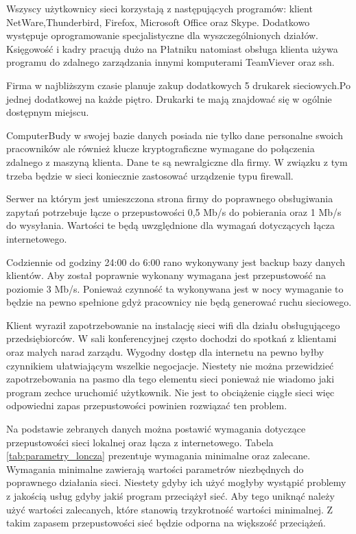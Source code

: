 \documentclass{report}
\begin{document}
Wszyscy użytkownicy sieci korzystają z następujących programów: klient NetWare,Thunderbird, Firefox, Microsoft Office oraz Skype. Dodatkowo występuje 
oprogramowanie specjalistyczne dla wyszczególnionych działów. Księgowość i kadry pracują dużo na Płatniku natomiast obsługa klienta używa programu
do zdalnego zarządzania innymi komputerami TeamViever oraz ssh.

Firma w najbliższym czasie planuje zakup dodatkowych 5 drukarek sieciowych.Po jednej dodatkowej na każde piętro. Drukarki te mają znajdować się
w ogólnie dostępnym miejscu.

ComputerBudy w swojej bazie danych posiada nie tylko dane personalne swoich pracowników ale również klucze kryptograficzne wymagane do połączenia zdalnego
z maszyną klienta. Dane te są newralgiczne dla firmy. W związku z tym trzeba będzie w sieci koniecznie zastosować urządzenie typu firewall.

Serwer na którym jest umieszczona strona firmy do poprawnego obsługiwania zapytań potrzebuje łącze o przepustowości 0,5 Mb/s do pobierania oraz
1 Mb/s do wysyłania. Wartości te będą uwzględnione dla wymagań dotyczących łącza internetowego.

Codziennie od godziny 24:00 do 6:00 rano wykonywany jest backup bazy danych klientów. Aby został poprawnie wykonany wymagana jest przepustowość 
na poziomie 3 Mb/s. Ponieważ czynność ta wykonywana jest w nocy wymaganie to będzie na pewno spełnione gdyż pracownicy nie będą generować ruchu
sieciowego.

Klient wyraził zapotrzebowanie na instalację sieci wifi dla działu obsługującego przedsiębiorców. W sali konferencyjnej często dochodzi  
do spotkań z klientami oraz małych narad zarządu. Wygodny dostęp dla internetu na pewno byłby czynnikiem ułatwiającym wszelkie negocjacje.
Niestety nie można przewidzieć zapotrzebowania na pasmo dla tego elementu sieci ponieważ nie wiadomo jaki program zechce uruchomić użytkownik.
Nie jest to obciążenie ciągłe sieci więc odpowiedni zapas przepustowości powinien rozwiązać ten problem.

Na podstawie zebranych danych można postawić wymagania dotyczące przepustowości sieci lokalnej oraz łącza z internetowego. Tabela \ref{tab:parametry_loncza}
prezentuje wymagania minimalne oraz zalecane. Wymagania minimalne zawierają wartości parametrów niezbędnych do poprawnego działania sieci. 
Niestety gdyby ich użyć mogłyby wystąpić problemy z jakością usług gdyby jakiś program przeciążył sieć. Aby tego uniknąć należy użyć wartości
zalecanych, które stanowią trzykrotność wartości minimalnej. Z takim zapasem przepustowości sieć będzie odporna na większość przeciążeń.
\end{document}
